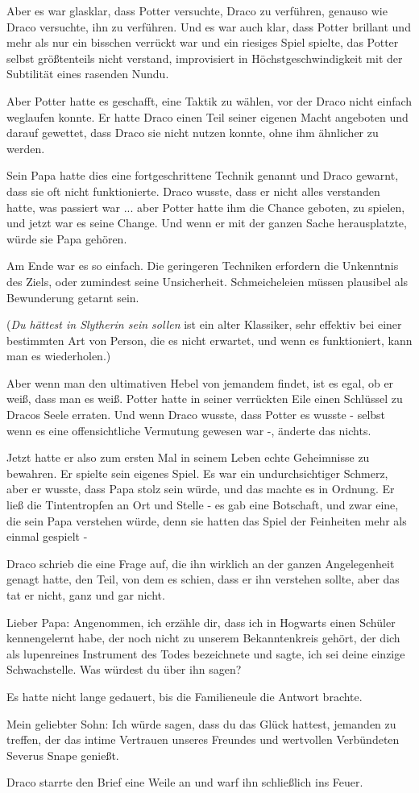 Aber es war glasklar, dass Potter versuchte, Draco zu verführen, genauso wie
Draco versuchte, ihn zu verführen. Und es war auch klar, dass Potter brillant
und mehr als nur ein bisschen verrückt war und ein riesiges Spiel spielte, das
Potter selbst größtenteils nicht verstand, improvisiert in Höchstgeschwindigkeit
mit der Subtilität eines rasenden Nundu.

Aber Potter hatte es geschafft, eine Taktik zu wählen, vor der Draco nicht
einfach weglaufen konnte. Er hatte Draco einen Teil seiner eigenen Macht
angeboten und darauf gewettet, dass Draco sie nicht nutzen konnte, ohne ihm
ähnlicher zu werden.

Sein Papa hatte dies eine fortgeschrittene Technik genannt und Draco gewarnt,
dass sie oft nicht funktionierte. Draco wusste, dass er nicht alles verstanden
hatte, was passiert war ... aber Potter hatte ihm die Chance geboten, zu spielen,
und jetzt war es seine Change. Und wenn er mit der ganzen Sache herausplatzte,
würde sie Papa gehören.

Am Ende war es so einfach. Die geringeren Techniken erfordern die Unkenntnis des
Ziels, oder zumindest seine Unsicherheit. Schmeicheleien müssen plausibel als
Bewunderung getarnt sein.

(\emph{\glqq{}Du hättest in Slytherin sein sollen\grqq{}} ist ein alter
Klassiker, sehr effektiv bei einer bestimmten Art von Person, die es nicht
erwartet, und wenn es funktioniert, kann man es wiederholen.)

Aber wenn man den ultimativen Hebel von jemandem findet, ist es egal, ob er
weiß, dass man es weiß. Potter hatte in seiner verrückten Eile einen Schlüssel
zu Dracos Seele erraten. Und wenn Draco wusste, dass Potter es wusste - selbst
wenn es eine offensichtliche Vermutung gewesen war -, änderte das nichts.

Jetzt hatte er also zum ersten Mal in seinem Leben echte Geheimnisse zu
bewahren. Er spielte sein eigenes Spiel. Es war ein undurchsichtiger Schmerz,
aber er wusste, dass Papa stolz sein würde, und das machte es in Ordnung. Er
ließ die Tintentropfen an Ort und Stelle - es gab eine Botschaft, und zwar eine,
die sein Papa verstehen würde, denn sie hatten das Spiel der Feinheiten mehr
als einmal gespielt -

Draco schrieb die eine Frage auf, die ihn wirklich an der ganzen Angelegenheit
genagt hatte, den Teil, von dem es schien, dass er ihn verstehen sollte, aber
das tat er nicht, ganz und gar nicht.

Lieber Papa: Angenommen, ich erzähle dir, dass ich in Hogwarts einen Schüler
kennengelernt habe, der noch nicht zu unserem Bekanntenkreis gehört, der dich
als \glqq{}lupenreines Instrument des Todes\grqq{} bezeichnete und sagte, ich
sei deine \glqq{}einzige Schwachstelle\grqq{}. Was würdest du über ihn sagen?

Es hatte nicht lange gedauert, bis die Familieneule die Antwort brachte.

Mein geliebter Sohn: Ich würde sagen, dass du das Glück hattest, jemanden zu
treffen, der das intime Vertrauen unseres Freundes und wertvollen Verbündeten
Severus Snape genießt.

Draco starrte den Brief eine Weile an und warf ihn schließlich ins Feuer.